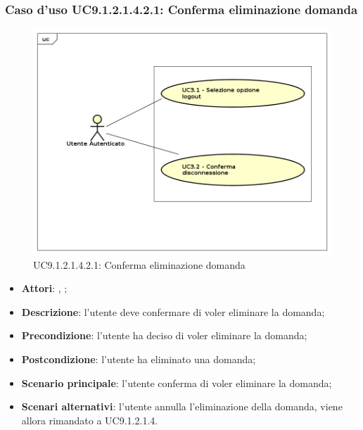 							\subsubsection{Caso d'uso UC9.1.2.1.4.2.1: Conferma eliminazione domanda}
							\label{UC9.1.2.1.4.2.1}
							\begin{figure}[h]
								\centering
								\includegraphics[scale=0.5,keepaspectratio]{UML/UC9.png}
								\caption{UC9.1.2.1.4.2.1: Conferma eliminazione domanda}
							\end{figure}
							\FloatBarrier
							\begin{itemize}
								\item \textbf{Attori}: \uau, \uaupro;
								\item \textbf{Descrizione}: l'utente deve confermare di voler eliminare la domanda;
								\item \textbf{Precondizione}: l'utente ha deciso di voler eliminare la domanda;
								\item \textbf{Postcondizione}: l'utente ha eliminato una domanda;
								\item \textbf{Scenario principale}: l'utente conferma di voler eliminare la domanda;
								\item \textbf{Scenari alternativi}: l'utente annulla l'eliminazione della domanda, viene allora rimandato a UC9.1.2.1.4.
							\end{itemize}	
																
